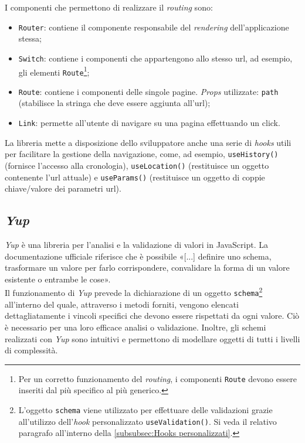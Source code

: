 I componenti che permettono di realizzare il \textit{routing} sono:
\begin{itemize}
  \item \texttt{Router}: contiene il componente responsabile del \textit{rendering} dell'applicazione stessa;
  
  \item \texttt{Switch}: contiene i componenti che appartengono allo stesso \gls{url}, ad esempio, gli elementi \texttt{Route}\footnote{Per un corretto funzionamento del \textit{routing}, i componenti \texttt{Route} devono essere inseriti dal più specifico al più generico.};
  
  \item \texttt{Route}: contiene i componenti delle singole pagine.
  \textit{Props} utilizzate: \texttt{path} (stabilisce la stringa che deve essere aggiunta all'\gls{url});

  \item \texttt{Link}: permette all'utente di navigare su una pagina effettuando un click.
\end{itemize}

La libreria mette a disposizione dello sviluppatore anche una serie di \textit{hooks} utili per facilitare la gestione della navigazione, come, ad esempio, \texttt{useHistory()} (fornisce l'accesso alla cronologia), \texttt{useLocation()} (restituisce un oggetto contenente l'\gls{url} attuale) e \texttt{useParams()} (restituisce un oggetto di coppie chiave/valore dei parametri \gls{url}).

\subsection{\textit{Yup}} 
\label{subsec:Yup}
\textit{Yup} è una libreria per l'analisi e la validazione di valori in JavaScript. La documentazione ufficiale riferisce che è possibile «[...] definire uno schema, trasformare un valore per farlo corrispondere, convalidare la forma di un valore esistente o entrambe le cose»\cite{jquense_Yup}.\\
Il funzionamento di \textit{Yup} prevede la dichiarazione di un oggetto \texttt{schema}\footnote{L'oggetto \texttt{schema} viene utilizzato per effettuare delle validazioni grazie all'utilizzo dell'\textit{hook} personalizzato \texttt{useValidation()}. Si veda il relativo paragrafo all'interno della \autoref{subsubsec:Hooks personalizzati}.} all'interno del quale, attraverso i metodi forniti, vengono elencati dettagliatamente i vincoli specifici che devono essere rispettati da ogni valore. Ciò è necessario per una loro efficace analisi o validazione.
Inoltre, gli schemi realizzati con \textit{Yup} sono intuitivi e permettono di modellare oggetti di tutti i livelli di complessità.

